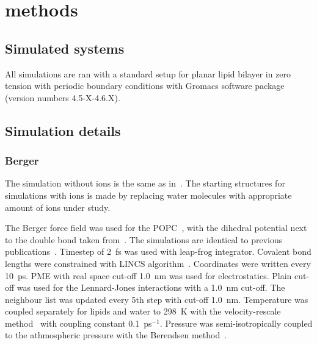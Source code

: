 \documentclass[pre,aps,floatfix,authordate1-4,twocolumn]{revtex4-1}
\begin{document}
\section{methods}

\subsection{Simulated systems}
All simulations are ran with a standard setup for planar lipid bilayer in zero tension
with periodic boundary conditions with Gromacs software package (version numbers 4.5-X-4.6.X).





\subsection{Simulation details}
\subsubsection{Berger}
The simulation without ions is the same as in~\cite{botan15}. The starting structures for simulations with ions is
made by replacing water molecules with appropriate amount of ions under study.

The Berger force field was used for the POPC~\cite{berger97}, with the dihedral potential next to the double bond 
taken from~\cite{bachar04}. The simulations are identical to previous publications~\cite{ollila07a,ferreira13,ferreira15}.
Timestep of 2~fs was used with leap-frog integrator. Covalent bond lengths were constrained with LINCS algorithm~\cite{hess97,hess07}. 
Coordinates were written every 10~ps. PME with real space cut-off 1.0~nm was used 
for electrostatics. Plain cut-off was used for the Lennard-Jones interactions with a 1.0~nm cut-off.
The neighbour list was updated every 5th step with cut-off 1.0~nm. Temperature was coupled separately
for lipids and water to 298~K with the velocity-rescale method~\cite{bussi07} with coupling constant 0.1~ps$^{-1}$.
Pressure was semi-isotropically coupled to the athmospheric pressure with the Berendsen method~\cite{berendsen84}.
\end{document}
